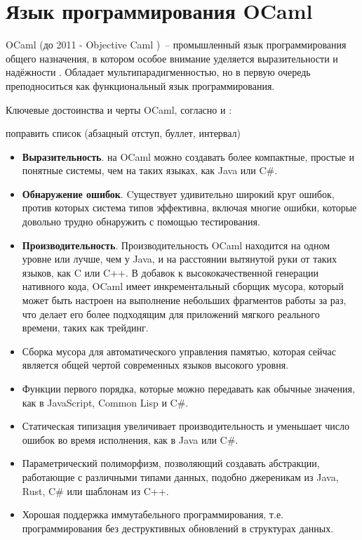 \section{Язык программирования OCaml}

OCaml (до 2011 - Objective Caml \cite{camlhistory})~-- промышленный язык программирования общего назначения,
в котором особое внимание уделяется выразительности и надёжности \cite{ocamlorg}. Обладает
мультипарадигменностью, но в первую очередь преподноситься как функциональный язык программирования.

Ключевые достоинства и черты OCaml, согласно \cite[c.~3]{yaron2011} и \cite{rwo-prologue}:

\TODO поправить список (абзацный отступ, буллет, интервал) \TODO
\begin{itemize}
      \item \textbf{Выразительность}. на OCaml можно создавать более компактные, простые и понятные системы,
            чем на таких языках, как Java или C\#.
      \item \textbf{Обнаружение ошибок}. Cуществует удивительно
            широкий круг ошибок, против которых система типов эффективна, включая многие ошибки, которые довольно трудно
            обнаружить с помощью тестирования.
      \item \textbf{Производительность}. Производительность OCaml находится на одном уровне или лучше,
            чем у Java, и на расстоянии вытянутой руки от таких языков, как C или C++. В добавок к высококачественной генерации нативного кода,
            OCaml имеет инкрементальный сборщик мусора, который может быть настроен на выполнение небольших
            фрагментов работы за раз, что делает его более подходящим для приложений мягкого реального времени,
            таких как трейдинг.
      \item Сборка мусора для автоматического управления памятью, которая сейчас является общей чертой современных языков высокого уровня.
      \item Функции первого порядка, которые можно передавать как обычные значения, как в JavaScript, Common Lisp и C\#.
      \item Статическая типизация увеличивает производительность и уменьшает число ошибок во время исполнения, как в Java или C\#.
      \item Параметрический полиморфизм, позволяющий создавать абстракции, работающие с различными типами данных,
            подобно джереникам из Java, Rust, C\# или шаблонам из C++.
      \item Хорошая поддержка иммутабельного программирования, т.е. программирования без деструктивных обновлений в структурах данных.

\end{itemize}
